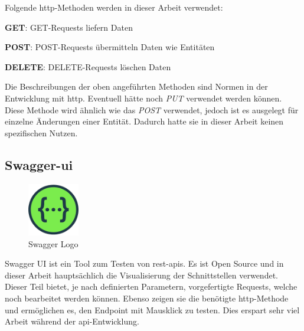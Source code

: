 Folgende \gls{http}-Methoden werden in dieser Arbeit verwendet:
\begin{compactitem}
    \item \textbf{GET}: GET-Requests liefern Daten \cite{httpAbout}
    \item \textbf{POST}: POST-Requests übermitteln Daten wie Entitäten \cite{httpAbout}
    \item \textbf{DELETE}: DELETE-Requests löschen Daten \cite{httpAbout}
\end{compactitem}

Die Beschreibungen der oben angeführten Methoden sind Normen in der Entwicklung mit \gls{http}. 
Eventuell hätte noch \emph{PUT} verwendet werden können.
Diese Methode wird ähnlich wie das \emph{POST} verwendet, jedoch ist es ausgelegt für einzelne Änderungen einer Entität. 
Dadurch hatte sie in dieser Arbeit keinen spezifischen Nutzen.  
\cite{httpAbout}

\subsection{Swagger-ui}
\begin{figure}
    \begin{center}
        \includegraphics[width=0.2\textwidth]{pics/logos/swagger.png}
        \caption{Swagger Logo}
    \end{center}
\end{figure}
Swagger UI ist ein Tool zum Testen von \gls{rest}-\gls{api}s. 
Es ist Open Source und in dieser Arbeit hauptsächlich die Visualisierung der Schnittstellen verwendet. 
Dieser Teil bietet, je nach definierten Parametern, vorgefertigte Requests, welche noch bearbeitet werden können. 
Ebenso zeigen sie die benötigte \gls{http}-Methode und ermöglichen es, den Endpoint mit Mausklick zu testen. 
Dies erspart sehr viel Arbeit während der \gls{api}-Entwicklung.
\cite{SwaggeruiAbout}

